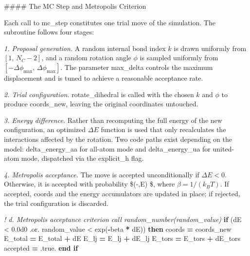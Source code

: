 \documentclass[
]{article}
\newenvironment{Shaded}{}{}
\newcommand{\BuiltInTok}[1]{\textcolor[rgb]{0.00,0.50,0.00}{#1}}
\newcommand{\CommentTok}[1]{\textcolor[rgb]{0.38,0.63,0.69}{\textit{#1}}}
\newcommand{\ConstantTok}[1]{\textcolor[rgb]{0.53,0.00,0.00}{#1}}
\newcommand{\FloatTok}[1]{\textcolor[rgb]{0.25,0.63,0.44}{#1}}
\newcommand{\KeywordTok}[1]{\textcolor[rgb]{0.00,0.44,0.13}{\textbf{#1}}}
\newcommand{\NormalTok}[1]{#1}
\newcommand{\OperatorTok}[1]{\textcolor[rgb]{0.40,0.40,0.40}{#1}}
\begin{document}
\#\#\#\# The MC Step and Metropolis Criterion

Each call to mc\_step constitutes one trial move of the simulation. The
subroutine follows four stages:

\emph{1. Proposal generation.} A random internal bond index \(k\) is
drawn uniformly from \([1,\, N_C - 2]\), and a random rotation angle
\(\phi\) is sampled uniformly from
\([-\Delta\phi_{\max},\, \Delta\phi_{\max}]\). The parameter max\_delta
controls the maximum displacement and is tuned to achieve a reasonable
acceptance rate.

\emph{2. Trial configuration.} rotate\_dihedral is called with the
chosen \(k\) and \(\phi\) to produce coords\_new, leaving the original
coordinates untouched.

\emph{3. Energy difference.} Rather than recomputing the full energy of
the new configuration, an optimized \(\Delta E\) function is used that
only recalculates the interactions affected by the rotation. Two code
paths exist depending on the model: delta\_energy\_aa for all-atom mode
and delta\_energy\_ua for united-atom mode, dispatched via the
explicit\_h flag.

\emph{4. Metropolis acceptance.} The move is accepted unconditionally if
\(\Delta    E < 0\). Otherwise, it is accepted with probability
\$\exp(-\beta ,\Delta E) \$, where \(\beta = 1/(k_B T)\). If accepted,
coords and the energy accumulators are updated in place; if rejected,
the trial configuration is discarded.

\begin{Shaded}
\begin{Highlighting}[]
\CommentTok{! d. Metropolis acceptance criterion}
\CommentTok{call random\_number(random\_value)}
\KeywordTok{if}\NormalTok{ (dE }\OperatorTok{\textless{}} \FloatTok{0.0d0} \OperatorTok{.or.}\NormalTok{ random\_value }\OperatorTok{\textless{}} \BuiltInTok{exp}\NormalTok{(}\KeywordTok{{-}}\NormalTok{beta }\KeywordTok{*}\NormalTok{ dE)) }\KeywordTok{then}
\NormalTok{  coords  }\KeywordTok{=}\NormalTok{ coords\_new}
\NormalTok{  E\_total }\KeywordTok{=}\NormalTok{ E\_total }\KeywordTok{+}\NormalTok{ dE}
\NormalTok{  E\_lj    }\KeywordTok{=}\NormalTok{ E\_lj    }\KeywordTok{+}\NormalTok{ dE\_lj}
\NormalTok{  E\_tors  }\KeywordTok{=}\NormalTok{ E\_tors  }\KeywordTok{+}\NormalTok{ dE\_tors}
\NormalTok{  accepted }\KeywordTok{=} \ConstantTok{.true.}
\KeywordTok{end if}
\end{Highlighting}
\end{Shaded}
\end{document}
